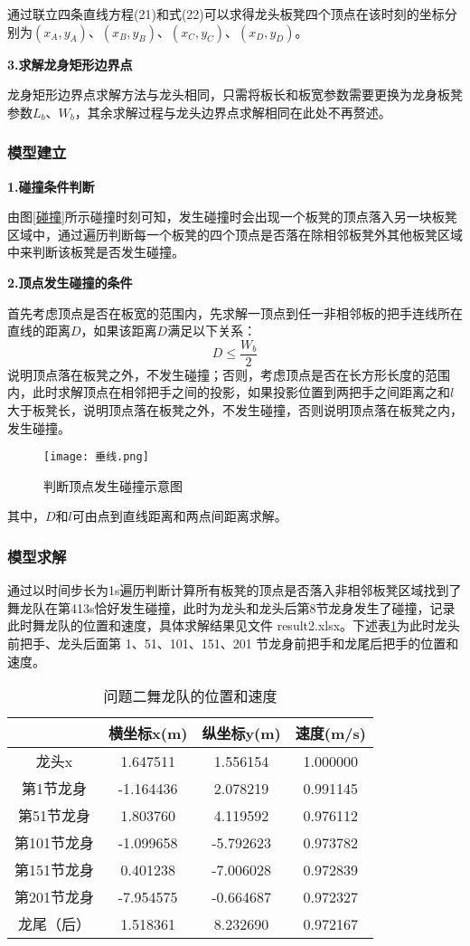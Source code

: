 \documentclass[withoutpreface,bwprint]{cumcmthesis} %
\begin{document}
	通过联立四条直线方程(21)和式(22)可以求得龙头板凳四个顶点在该时刻的坐标分别为$(x_A,y_A)$、$(x_B,y_B)$、$(x_C,y_C)$、$(x_D,y_D)$。
	
	\textbf{3.求解龙身矩形边界点}
	
	龙身矩形边界点求解方法与龙头相同，只需将板长和板宽参数需要更换为龙身板凳参数$L_b$、$W_b$，其余求解过程与龙头边界点求解相同在此处不再赘述。
	\subsubsection{模型建立}
	\textbf{1.碰撞条件判断}
	
	由图\ref{碰撞}所示碰撞时刻可知，发生碰撞时会出现一个板凳的顶点落入另一块板凳区域中，通过遍历判断每一个板凳的四个顶点是否落在除相邻板凳外其他板凳区域中来判断该板凳是否发生碰撞。
	
	\textbf{2.顶点发生碰撞的条件}
	
	首先考虑顶点是否在板宽的范围内，先求解一顶点到任一非相邻板的把手连线所在直线的距离$D$，如果该距离$D$满足以下关系：
	\begin{equation}
		D\le \dfrac{W_b}{2}
	\end{equation}
	说明顶点落在板凳之外，不发生碰撞；否则，考虑顶点是否在长方形长度的范围内，此时求解顶点在相邻把手之间的投影，如果投影位置到两把手之间距离之和$l$大于板凳长，说明顶点落在板凳之外，不发生碰撞，否则说明顶点落在板凳之内，发生碰撞。
	\begin{figure}[H]
		\centering
		\texttt{[image: 垂线.png]}
		\caption{判断顶点发生碰撞示意图}
		\label{垂线} %
	\end{figure}
	其中，$D$和$l$可由点到直线距离和两点间距离求解。
	\subsubsection{模型求解}
	通过以时间步长为1s遍历判断计算所有板凳的顶点是否落入非相邻板凳区域找到了舞龙队在第413s恰好发生碰撞，此时为龙头和龙头后第8节龙身发生了碰撞，记录此时舞龙队的位置和速度，具体求解结果见文件 result2.xlsx。下述表\ref{问题二位置和速度}为此时龙头前把手、龙头后面第 1、51、101、151、201 节龙身前把手和龙尾后把手的位置和速度。
	\begin{table}[H]
		\centering
		\setlength{\tabcolsep}{15pt}
		\caption{问题二舞龙队的位置和速度} 
		\label{问题二位置和速度} 
		\setlength\extrarowheight{-1pt}
		\begin{tabular}{|c|c|c|c|}
			\hline
			& 横坐标x(m) & 纵坐标y(m) & 速度(m/s) \\ \hline
			龙头x    & 1.647511& 1.556154 &1.000000 \\ \hline
			第1节龙身  &-1.164436&2.078219&0.991145\\ \hline
			第51节龙身 &1.803760&4.119592& 0.976112 \\ \hline
			第101节龙身 &-1.099658&-5.792623&0.973782  \\ \hline
			第151节龙身  &0.401238 & -7.006028&0.972839 \\ \hline
			第201节龙身  & -7.954575 &-0.664687 &0.972327\\ \hline
			龙尾（后）  & 1.518361&8.232690&0.972167 \\ \hline
		\end{tabular}
	\end{table}
\end{document}
